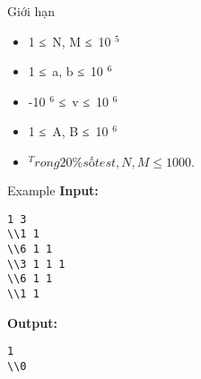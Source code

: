Giới hạn
\begin{itemize}
	\item     1 ≤ N, M ≤ 10    $^     5    $
	\item     1 ≤ a, b ≤ 10    $^     6    $
	\item     -10    $^     6    $    ≤ v ≤ 10    $^     6    $
	\item     1 ≤ A, B ≤ 10    $^     6    $
	\item $^     Trong 20\% số test, N, M ≤ 1000.    $
\end{itemize}
Example
\textbf{    Input:   }
\begin{verbatim}
1 3
\\1 1
\\6 1 1 
\\3 1 1 1 
\\6 1 1
\\1 1\end{verbatim}

\textbf{    Output:   }
\begin{verbatim}
1
\\0\end{verbatim}